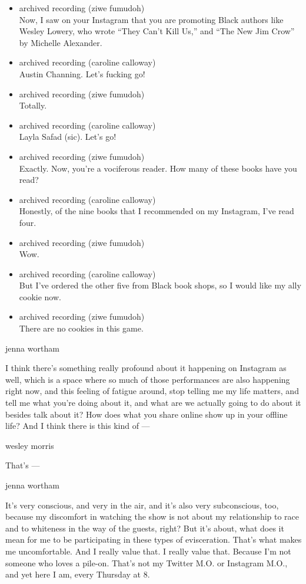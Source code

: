 \begin{itemize}
\item
  archived recording (ziwe fumudoh)\\
  Now, I saw on your Instagram that you are promoting Black authors like
  Wesley Lowery, who wrote ``They Can't Kill Us,'' and ``The New Jim
  Crow'' by Michelle Alexander.
\item
  archived recording (caroline calloway)\\
  Austin Channing. Let's fucking go!
\item
  archived recording (ziwe fumudoh)\\
  Totally.
\item
  archived recording (caroline calloway)\\
  Layla Safad (sic). Let's go!
\item
  archived recording (ziwe fumudoh)\\
  Exactly. Now, you're a vociferous reader. How many of these books have
  you read?
\item
  archived recording (caroline calloway)\\
  Honestly, of the nine books that I recommended on my Instagram, I've
  read four.
\item
  archived recording (ziwe fumudoh)\\
  Wow.
\item
  archived recording (caroline calloway)\\
  But I've ordered the other five from Black book shops, so I would like
  my ally cookie now.
\item
  archived recording (ziwe fumudoh)\\
  There are no cookies in this game.
\end{itemize}

jenna wortham

I think there's something really profound about it happening on
Instagram as well, which is a space where so much of those performances
are also happening right now, and this feeling of fatigue around, stop
telling me my life matters, and tell me what you're doing about it, and
what are we actually going to do about it besides talk about it? How
does what you share online show up in your offline life? And I think
there is this kind of ---

wesley morris

That's ---

jenna wortham

It's very conscious, and very in the air, and it's also very
subconscious, too, because my discomfort in watching the show is not
about my relationship to race and to whiteness in the way of the guests,
right? But it's about, what does it mean for me to be participating in
these types of evisceration. That's what makes me uncomfortable. And I
really value that. I really value that. Because I'm not someone who
loves a pile-on. That's not my Twitter M.O. or Instagram M.O., and yet
here I am, every Thursday at 8.


